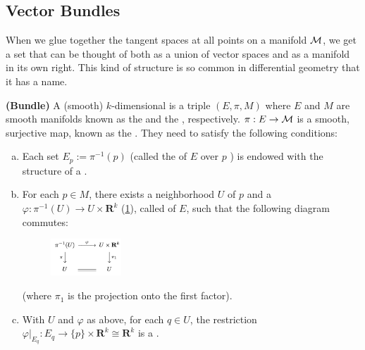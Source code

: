 \documentclass[12pt]{article} %
\newcommand{\bfs}[1]{\textbf{({#1}) }}
\begin{document}
\subsection{Vector Bundles}
When we glue together the tangent spaces at all points on a manifold $\mathcal{M}$, we get a set that can be thought of both as a union of vector spaces and as a manifold in its own right. This kind of structure is so common in differential geometry that it has a name.
\begin{defa}\bfs{Bundle}
A (smooth) $k$-dimensional   is a triple $(E,\pi, M)$ where $E$ and $M$ are smooth manifolds known as the  and the , respectively. $\pi:E\to\mathcal{M}$ is a smooth, surjective map, known as the . They need to satisfy the following conditions:
\begin{enumerate}[(a)]
    \item Each set $E_{p}:=\pi^{-1}(p)$ (called the  of $E$ over $p$ ) is endowed with the structure of a .
    \item For each $p \in M$, there exists a neighborhood $U$ of $p$ and a  $\varphi: \pi^{-1}(U) \rightarrow U \times \mathbf{R}^{k}$ (\cref{fig:dfadg3q}), called  of $E$, such that the following diagram commutes:
    \begin{figure}[h]
    \centering
    \includegraphics[width=0.25\textwidth]{Figs/1.png}
    \label{fig:dfadg3q}
\end{figure}
    (where $\pi_1$ is the projection onto the first factor).
   \item With $U$ and $\varphi$ as above, for each $q \in U$, the restriction $\left.\varphi\right|_{E_{q}}: E_{q} \rightarrow \{p\}\times\mathbf{R}^{k}\cong \mathbf{R}^{k}$ is a .
\end{enumerate}
\end{defa}
\end{document}
